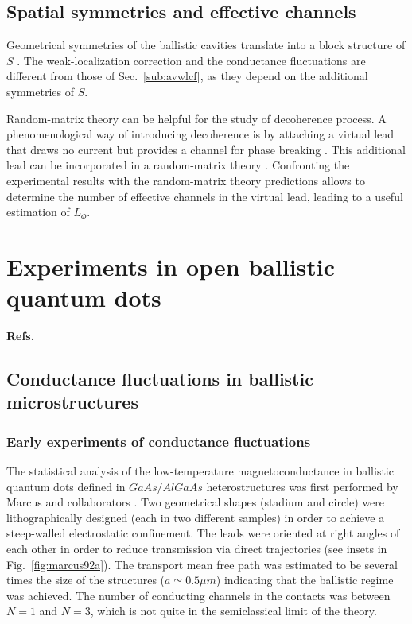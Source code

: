 \documentclass[a4paper,10pt]{article}
\newcommand{\nin}{\noindent}
\begin{document}
\subsection{Spatial symmetries and effective channels}
\label{subsec:ssec}

\nin Geometrical symmetries of the ballistic cavities translate into a block structure of $S$ \cite{BaMe96}. The weak-localization correction and the conductance fluctuations are different from those of Sec.~\ref{sub:avwlcf}, as they depend on the additional symmetries of $S$.

\nin Random-matrix theory can be helpful for the study of decoherence process. A phenomenological way of introducing decoherence is by attaching a virtual lead that draws no current but provides a channel for phase breaking \cite{Butt86b}. This additional lead can be incorporated in a random-matrix theory \cite{BaMeFL,BrBeFL}. Confronting the experimental results with the random-matrix theory predictions allows to determine the number of effective channels in the virtual lead, leading to a useful estimation of $L_{\Phi}$.

\section{Experiments in open ballistic quantum dots}
{\bf Refs.~\cite{Westervelt}}

\subsection{Conductance fluctuations in ballistic microstructures}
\label{subsec:cfibm}

\subsubsection{Early experiments of conductance fluctuations}
\label{subsec:eecf}

\nin The statistical analysis of the low-temperature magnetoconductance in 
ballistic quantum dots defined in $GaAs/AlGaAs$ heterostructures was first performed by Marcus and collaborators \cite{Mar92,Chaos}. Two geometrical shapes (stadium and circle) were lithographically designed (each in two different samples) in order to achieve a steep-walled electrostatic confinement. The leads were oriented at right angles of each other in order to reduce transmission via direct trajectories (see insets in Fig.~\ref{fig:marcus92a}). The transport mean free path was estimated to be several times the size of the structures ($a \simeq 0.5 \mu m$) indicating that the ballistic regime was achieved. The number of conducting channels in the contacts was between $N\!=\!1$ and $N\!=\!3$, which is not quite in the semiclassical limit of the theory. 
\end{document}
